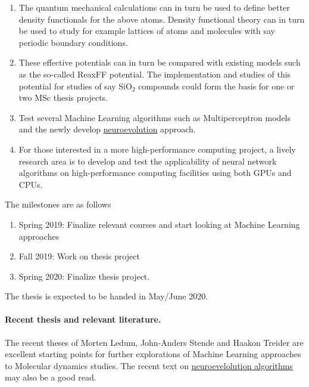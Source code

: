 \documentclass[%
oneside,                 %
final,                   %
10pt]{article}
\begin{document}
\begin{enumerate}
\item The quantum mechanical calculations can in turn be used to define better density functionals for the above atoms. Density functional theory can in turn be used to study for example lattices of atoms and molecules with say periodic boundary conditions.  

\item These effective potentials can in turn be compared with existing models such as the so-called ReaxFF potential. The implementation and studies of this potential for studies of say SiO$_2$ compounds could form the basis for one or two MSc thesis projects. 

\item Test several Machine Learning algorithms such as Multiperceptron models and the newly develop \href{{https://www.oreilly.com/ideas/neuroevolution-a-different-kind-of-deep-learning}}{neuroevolution} approach. 

\item For those interested in a more high-performance computing project, a lively research area is to develop and test the applicability of neural network algorithms on high-performance computing facilities using both GPUs and CPUs. 
\end{enumerate}

\noindent
The milestones are as follows
\begin{enumerate}
\item Spring 2019: Finalize relevant courses and start looking at Machine Learning approaches

\item Fall 2019: Work on thesis project

\item Spring 2020: Finalize thesis project.
\end{enumerate}

\noindent
The thesis is expected to be handed in May/June  2020.



\paragraph{Recent thesis and relevant literature.}
The recent theses of Morten Ledum, John-Anders Stende and Haakon Treider are excellent starting points for further explorations of Machine Learning approaches to Molecular dynamics studies. The recent text on \href{{https://www.oreilly.com/ideas/neuroevolution-a-different-kind-of-deep-learning}}{neuroevelolution algorithms}  may also be a good read.









\end{document}
